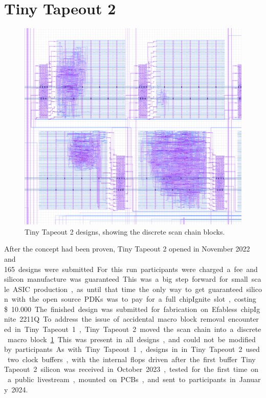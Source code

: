 \section{Tiny Tapeout 2}
\label{sec:tinytapeout2}

\begin{figure}[!t]
\centering
\includegraphics[width=\columnwidth]{./Figs/tt02_gds_zoom.png}
\caption{Tiny Tapeout 2 designs, showing the discrete scan chain blocks.}
\label{fig:TT02_separate_scan_blocks}
\end{figure}

After the concept had been proven, Tiny Tapeout 2 opened in November 2022 and \qty{165} designs were submitted. For this run participants were charged a fee and silicon manufacture was guaranteed. This was a big step forward for small scale ASIC production, as until that time the only way to get guaranteed silicon with the open source PDKs was to pay for a full chipIgnite slot, costing {\$}\qty{10,000}. The finished design was submitted for fabrication on Efabless chipIgnite 2211Q.

To address the issue of accidental macro block removal encountered in Tiny Tapeout 1, Tiny Tapeout 2 moved the scan chain into a discrete macro block~\ref{fig:TT02_separate_scan_blocks}. This was present in all designs, and could not be modified by participants.

As with Tiny Tapeout 1, designs in in Tiny Tapeout 2 used two clock buffers, with the internal flops driven after the first buffer.

Tiny Tapeout 2 silicon was received in October 2023, tested for the first time on a public livestream, mounted on PCBs, and sent to participants in January 2024.
